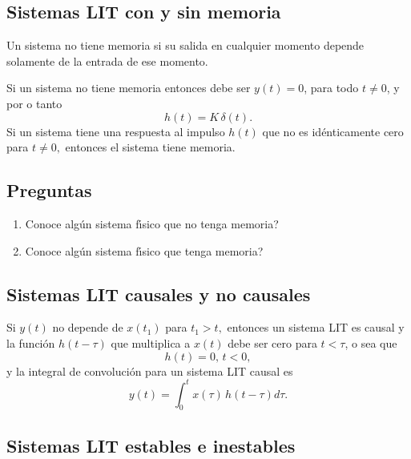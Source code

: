 \subsection{Sistemas LIT con y sin memoria}

Un sistema no tiene memoria si su salida en cualquier momento depende
solamente de la entrada de ese momento.

Si un sistema no tiene memoria entonces debe ser $y\left( t\right) =0$, para todo $t\neq 0$, y por o tanto
\begin{equation}
h\left( t\right) = K \, \delta \left( t\right) .
\end{equation}
Si un sistema tiene una respuesta al impulso $h\left( t\right) $ que no es
id\'{e}nticamente cero para $t\neq 0,$ entonces el sistema tiene memoria.

\subsection{Preguntas}

\begin{enumerate}
\item \textquestiondown Conoce alg\'{u}n sistema f\'{\i}sico que no tenga memoria?
\item \textquestiondown Conoce alg\'{u}n sistema f\'{\i}sico que tenga memoria?
\end{enumerate}

\subsection{Sistemas LIT causales y no causales}

Si $y(t)$ no depende de $x(t_{1})$ para $t_{1}>t,$ entonces un sistema LIT es causal y la funci\'{o}n 
$h\left( t-\tau \right) $ que multiplica a $x(t)$ debe ser cero para $t<\tau $, o sea que 
\begin{equation}
h\left( t\right) =0, \, t<0,
\end{equation}
y la integral de convoluci\'{o}n para un sistema LIT causal es 
\begin{equation}
y\left( t\right) =\int_{0}^{t}x\left( \tau \right) \, h\left( t-\tau \right)
d\tau .
\end{equation}

\subsection{Sistemas LIT estables e inestables}

